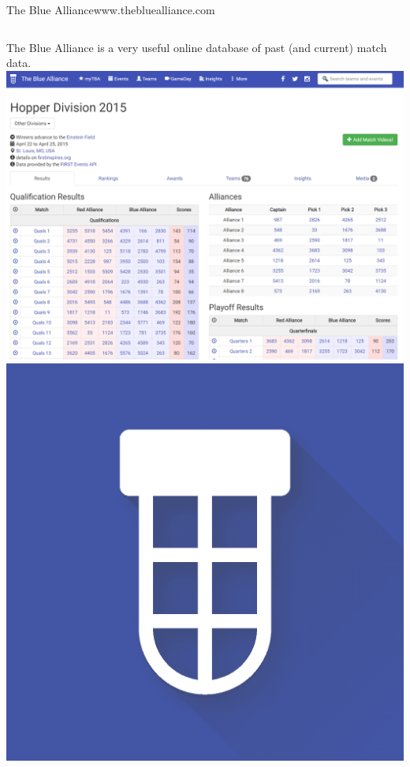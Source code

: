 \documentclass[10pt]{beamer}
\begin{document}
\begin{frame}{The Blue Alliance}{www.thebluealliance.com   \cite{thebluealliance}}
	\begin{columns}
			The Blue Alliance is a very useful online database of past (and current) match data.\\
			\includegraphics[height=0.5\textheight]{Images/tba_website}
			\includegraphics[width=\columnwidth]{Images/tba_logo}
	\end{columns}
\end{frame}
\end{document}
